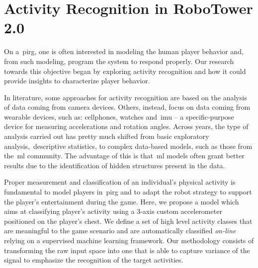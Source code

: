 \chapter{Activity Recognition in RoboTower 2.0}\label{ch:activity}
On a~\gls{pirg}, one is often interested in modeling the human player behavior and, from such modeling, program the system to respond properly. Our research towards this objective began by exploring activity recognition and how it could provide insights to characterize player behavior. 

In literature, some approaches for activity recognition are based on the analysis of data coming from camera devices. Others, instead, focus on data coming from wearable devices, such as: cellphones, watches and~\gls{imu} -- a specific-purpose device for measuring accelerations and rotation angles. Across years, the type of analysis carried out has pretty much shifted from basic exploratory analysis,~\eg descriptive statistics, %
to complex data-based models, such as those from the~\gls{ml} community. The advantage of this is that~\gls{ml} models often grant better results due to the identification of hidden structures present in the data.

Proper measurement and classification of an individual's physical  activity is fundamental to model players in~\gls{pirg} and to adapt the robot strategy to support the player's entertainment during the game. Here, we propose a model which aims at classifying player's activity using a 3-axis custom accelerometer positioned on the player's chest. We define a set of high level activity classes that are meaningful to the game scenario and are automatically classified \textit{on-line} relying on a supervised machine learning framework. Our methodology consists of transforming the raw input space into one that is able to capture variance of the signal to emphasize the recognition of the target activities. 

